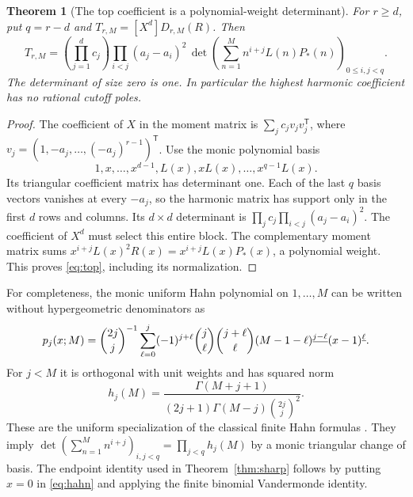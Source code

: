\documentclass[11pt,letterpaper]{article}
\numberwithin{equation}{section}
\newtheorem{theorem}{Theorem}[section]
\theoremstyle{definition}\newtheorem{definition}[theorem]{Definition}
\theoremstyle{remark}\newtheorem{remark}[theorem]{Remark}
\begin{document}
\begin{theorem}[The top coefficient is a polynomial-weight determinant]
\label{thm:compression}
For $r\ge d$, put $q=r-d$ and
$T_{r,M}=[X^d]D_{r,M}(R)$. Then
\begin{equation}\label{eq:top}
 \boxed{\displaystyle
 T_{r,M}=\left(\prod_{j=1}^d c_j\right)
          \prod_{i<j}(a_j-a_i)^2\,
     \det\left(\sum_{n=1}^M n^{i+j}L(n)P_*(n)\right)_{0\le i,j<q}.}
\end{equation}
The determinant of size zero is one. In particular the highest
harmonic coefficient has no rational cutoff poles.
\end{theorem}
\begin{proof}
The coefficient of $X$ in the moment matrix is
$\sum_j c_jv_jv_j^{\mathsf T}$, where
$v_j=(1,-a_j,\ldots,(-a_j)^{r-1})^{\mathsf T}$.
Use the monic polynomial basis
\[
       1,x,\ldots,x^{d-1},L(x),xL(x),\ldots,x^{q-1}L(x).
\]
Its triangular coefficient matrix has determinant one. Each of the
last $q$ basis vectors vanishes at every $-a_j$, so the harmonic
matrix has support only in the first $d$ rows and columns. Its
$d\times d$ determinant is
$\prod_j c_j\prod_{i<j}(a_j-a_i)^2$.
The coefficient of $X^d$ must select this entire block. The complementary
moment matrix sums $x^{i+j}L(x)^2R(x)=x^{i+j}L(x)P_*(x)$, a polynomial
weight. This proves \eqref{eq:top}, including its normalization.
\end{proof}

For completeness, the monic uniform Hahn polynomial on $1,\ldots,M$
can be written without hypergeometric denominators as
\begin{equation}\label{eq:hahn}
 p_j(x;M)=\binom{2j}{j}^{-1}
 \sum_{\ell=0}^j(-1)^{j+\ell}\binom j\ell\binom{j+\ell}{\ell}
       (M-1-\ell)^{\underline{j-\ell}}(x-1)^{\underline{\ell}}.
\end{equation}
For $j<M$ it is orthogonal with unit weights and has squared norm
\begin{equation}\label{eq:hahnnorm}
 h_j(M)=\frac{\Gamma(M+j+1)}
                  {(2j+1)\Gamma(M-j)\binom{2j}{j}^{\!2}}.
\end{equation}
These are the uniform specialization of the classical finite Hahn
formulas \cite{dlmf-hahn}. They imply
$\det(\sum_{n=1}^M n^{i+j})_{i,j<q}=\prod_{j<q}h_j(M)$ by a monic
triangular change of basis. The endpoint identity used in
Theorem~\ref{thm:sharp} follows by putting $x=0$ in \eqref{eq:hahn}
and applying the finite binomial Vandermonde identity.
\end{document}
